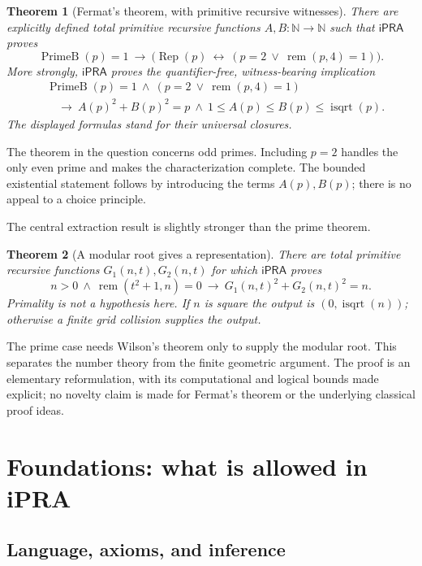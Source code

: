 \documentclass[11pt,letterpaper]{article}
\newtheorem{theorem}{Theorem}[section]
\theoremstyle{definition}
\theoremstyle{remark}
\newcommand{\N}{\mathbb N}
\newcommand{\ipra}{\mathsf{iPRA}}
\newcommand{\PrimeB}{\operatorname{PrimeB}}
\newcommand{\sqroot}{\operatorname{isqrt}}
\newcommand{\remd}{\operatorname{rem}}
\begin{document}
\begin{theorem}[Fermat's theorem, with primitive recursive witnesses]
\label{thm:main}
There are explicitly defined total primitive recursive functions
\(A,B:\N\to\N\) such that \(\ipra\) proves
\[
 \PrimeB(p)=1\ \longrightarrow\
 \bigl(\operatorname{Rep}(p)\ \longleftrightarrow\
       (p=2\ \vee\ \remd(p,4)=1)\bigr).
\]
More strongly, \(\ipra\) proves the quantifier-free, witness-bearing implication
\[
\begin{split}
 &\PrimeB(p)=1\ \wedge\
       (p=2\ \vee\ \remd(p,4)=1)\\
 &\quad\longrightarrow\
 A(p)^2+B(p)^2=p\
 \wedge\ 1\le A(p)\le B(p)\le\sqroot(p).
\end{split}
\]
The displayed formulas stand for their universal closures.
\end{theorem}

The theorem in the question concerns odd primes. Including \(p=2\) handles
the only even prime and makes the characterization complete. The bounded
existential statement follows by introducing the terms \(A(p),B(p)\);
there is no appeal to a choice principle.

The central extraction result is slightly stronger than the prime theorem.

\begin{theorem}[A modular root gives a representation]
\label{thm:root-to-squares}
There are total primitive recursive functions \(G_1(n,t),G_2(n,t)\) for which
\(\ipra\) proves
\[
 n>0\ \wedge\ \remd(t^2+1,n)=0
 \ \longrightarrow\
 G_1(n,t)^2+G_2(n,t)^2=n.
\]
Primality is not a hypothesis here. If \(n\) is square the output is
\((0,\sqroot(n))\); otherwise a finite grid collision supplies the output.
\end{theorem}

The prime case needs Wilson's theorem only to supply the modular root.
This separates the number theory from the finite geometric argument.
The proof is an elementary reformulation, with its computational and
logical bounds made explicit; no novelty claim is made for Fermat's
theorem or the underlying classical proof ideas.

\section{Foundations: what is allowed in iPRA}
\label{sec:foundations}

\subsection{Language, axioms, and inference}
\end{document}
